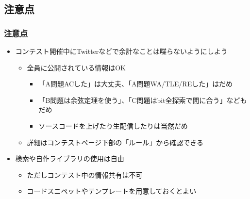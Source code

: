 \documentclass[t, aspectratio=169, dvipdfmx]{beamer}
\begin{document}
\subsection{注意点}
\begin{frame}
  \frametitle{注意点}
  \begin{itemize}
    \item コンテスト開催中にTwitterなどで余計なことは喋らないようにしよう
    \begin{itemize}
      \item 全員に公開されている情報はOK
      \begin{itemize}
        \item 「A問題ACした」は大丈夫、「A問題WA/TLE/REした」はだめ
        \item 「B問題は余弦定理を使う」、「C問題はbit全探索で間に合う」などもだめ
        \item ソースコードを上げたり生配信したりは当然だめ
      \end{itemize}
      \item 詳細はコンテストページ下部の「ルール」から確認できる
    \end{itemize}
    \item 検索や自作ライブラリの使用は自由
    \begin{itemize}
      \item ただしコンテスト中の情報共有は不可
      \item コードスニペットやテンプレートを用意しておくとよい
    \end{itemize}
  \end{itemize}
\end{frame}
\end{document}
